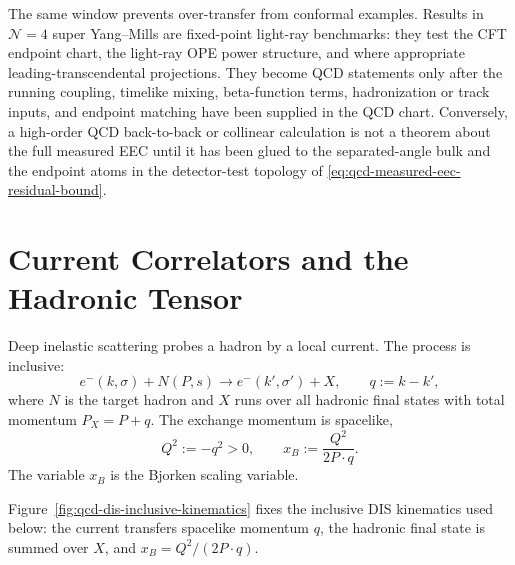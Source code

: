 \begin{controlledapproximation}
The same window prevents over-transfer from conformal examples.  Results in
\(\mathcal N=4\) super Yang--Mills are fixed-point light-ray benchmarks:
they test the CFT endpoint chart, the light-ray OPE power structure, and
where appropriate leading-transcendental projections.  They become QCD
statements only after the running coupling, timelike mixing, beta-function
terms, hadronization or track inputs, and endpoint matching have been supplied
in the QCD chart.  Conversely, a high-order QCD back-to-back or collinear
calculation is not a theorem about the full measured EEC until it has been
glued to the separated-angle bulk and the endpoint atoms in the detector-test
topology of \eqref{eq:qcd-measured-eec-residual-bound}.
\end{controlledapproximation}

\section{Current Correlators and the Hadronic Tensor}

Deep inelastic scattering probes a hadron by a local current.  The process is
inclusive:
\[
  e^-(k,\sigma)+N(P,s)\longrightarrow e^-(k',\sigma')+X,
  \qquad
  q:=k-k',
\]
where \(N\) is the target hadron and \(X\) runs over all hadronic final states
with total momentum \(P_X=P+q\).  The exchange momentum is spacelike,
\[
  Q^2:=-q^2>0,
  \qquad
  x_B:=\frac{Q^2}{2P\cdot q}.
\]
The variable \(x_B\) is the Bjorken scaling variable.

Figure~\ref{fig:qcd-dis-inclusive-kinematics} fixes the inclusive DIS
kinematics used below: the current transfers spacelike momentum \(q\), the
hadronic final state is summed over \(X\), and \(x_B=Q^2/(2P\cdot q)\).

